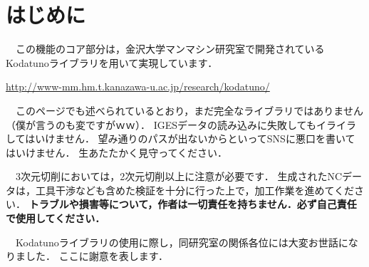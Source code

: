 \section*{はじめに}
　この機能のコア部分は，金沢大学マンマシン研究室で開発されているKodatunoライブラリを用いて実現しています．
\begin{center}
\url{http://www-mm.hm.t.kanazawa-u.ac.jp/research/kodatuno/}
\end{center}
　このページでも述べられているとおり，まだ完全なライブラリではありません（僕が言うのも変ですがｗｗ）．
IGESデータの読み込みに失敗してもイライラしてはいけません．
望み通りのパスが出ないからといってSNSに悪口を書いてはいけません．
生あたたかく見守ってください．

　3次元切削においては，2次元切削以上に注意が必要です．
生成されたNCデータは，工具干渉なども含めた検証を十分に行った上で，加工作業を進めてください．
\textbf{トラブルや損害等について，作者は一切責任を持ちません．必ず自己責任で使用してください．}

\vspace*{2zh}
　Kodatunoライブラリの使用に際し，同研究室の関係各位には大変お世話になりました．
ここに謝意を表します．
